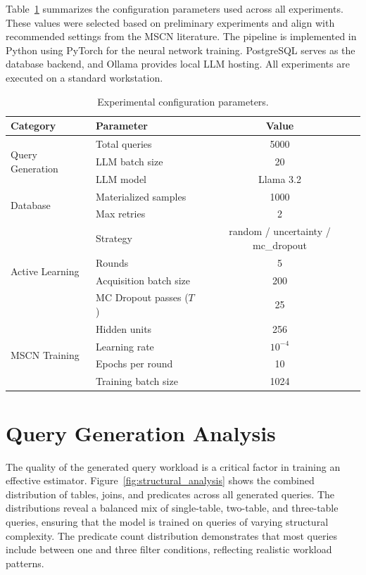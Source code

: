 Table~\ref{tab:exp_config} summarizes the configuration parameters used across all experiments. These values were selected based on preliminary experiments and align with recommended settings from the MSCN literature. The pipeline is implemented in Python using PyTorch for the neural network training. PostgreSQL serves as the database backend, and Ollama provides local LLM hosting. All experiments are executed on a standard workstation.

\begin{table}[htbp]
\centering
\caption{Experimental configuration parameters.}
\label{tab:exp_config}
\begin{tabular}{|l|l|c|}
\hline
\textbf{Category} & \textbf{Parameter} & \textbf{Value} \\
\hline
\multirow{3}{*}{Query Generation} & Total queries & 5000 \\
 & LLM batch size & 20 \\
 & LLM model & Llama 3.2 \\
\hline
\multirow{2}{*}{Database} & Materialized samples & 1000 \\
 & Max retries & 2 \\
\hline
\multirow{4}{*}{Active Learning} & Strategy & random / uncertainty / mc\_dropout \\
 & Rounds & 5 \\
 & Acquisition batch size & 200 \\
 & MC Dropout passes ($T$) & 25 \\
\hline
\multirow{4}{*}{MSCN Training} & Hidden units & 256 \\
 & Learning rate & $10^{-4}$ \\
 & Epochs per round & 10 \\
 & Training batch size & 1024 \\
\hline
\end{tabular}
\end{table}


\section{Query Generation Analysis}

The quality of the generated query workload is a critical factor in training an effective estimator. Figure~\ref{fig:structural_analysis} shows the combined distribution of tables, joins, and predicates across all generated queries. The distributions reveal a balanced mix of single-table, two-table, and three-table queries, ensuring that the model is trained on queries of varying structural complexity. The predicate count distribution demonstrates that most queries include between one and three filter conditions, reflecting realistic workload patterns.

